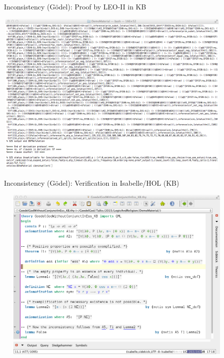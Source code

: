 \documentclass[9pt,mathserif,unknownkeysallowed,xcolor=dvipsnames]{beamer}
\newenvironment{changemargin}[2]{%
  \begin{list}{}{%
    \setlength{\topsep}{0pt}%
    \setlength{\leftmargin}{#1}%
    \setlength{\rightmargin}{#2}%
    \setlength{\listparindent}{\parindent}%
    \setlength{\itemindent}{\parindent}%
    \setlength{\parsep}{\parskip}%
  }%
\item[]
}{\end{list}}
\begin{document}
\begin{frame}{Inconsistency (G\"odel): Proof by LEO-II in KB}
\begin{changemargin}{-.5cm}{-1cm}
\colorbox{gray!20}{
\includegraphics[width=11.5cm,height=8cm]{./DemoMaterial/LeoProof.png}
}
\end{changemargin}
\end{frame}



\begin{frame}{Inconsistency (G\"odel): Verification in Isabelle/HOL (KB)}
\begin{changemargin}{-.5cm}{-1cm}
\includegraphics[width=12cm,height=8.5cm]{./DemoMaterial/GoedelGodWithoutConjunctInEss_KB.png}
\end{changemargin}
\end{frame}
\end{document}
